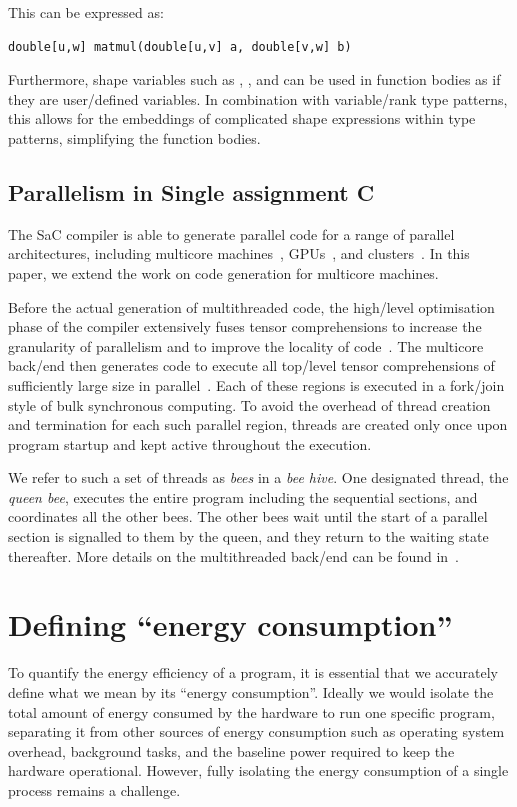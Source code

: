 This can be expressed as:
\begin{verbatim}
double[u,w] matmul(double[u,v] a, double[v,w] b)
\end{verbatim}

Furthermore, shape variables such as , , and  can be used in function bodies as if they are user\-/defined variables.
In combination with variable\-/rank type patterns, this allows for the embeddings of complicated shape expressions within type patterns, simplifying the function bodies.

\subsection{Parallelism in Single assignment C}\label{sec:parallelism}
The SaC compiler is able to generate parallel code for a range of parallel architectures, including multicore machines~\cite{grelck2005shared}, GPUs~\cite{guo2011breaking,janssen2022mapping}, and clusters~\cite{macht2019sac}.
In this paper, we extend the work on code generation for multicore machines.

Before the actual generation of multithreaded code, the high\-/level optimisation phase of the compiler extensively fuses tensor comprehensions to increase the granularity of parallelism and to improve the locality of code~\cite{grelck2006sac}.
The multicore back\-/end then generates code to execute all top\-/level tensor comprehensions of sufficiently large size in parallel~\cite{grelck2005shared}.
Each of these regions is executed in a fork\-/join style of bulk synchronous computing.
To avoid the overhead of thread creation and termination for each such parallel region, threads are created only once upon program startup and kept active throughout the execution.

We refer to such a set of threads as \emph{bees} in a \emph{bee hive}.
One designated thread, the \emph{queen bee}, executes the entire program including the sequential sections, and coordinates all the other bees.
The other bees wait until the start of a parallel section is signalled to them by the queen, and they return to the waiting state thereafter.
More details on the multithreaded back\-/end can be found in~\cite{grelck2005shared}.

\section{Defining ``energy consumption''}\label{sec:energy}
To quantify the energy efficiency of a program, it is essential that we accurately define what we mean by its ``energy consumption''.
Ideally we would isolate the total amount of energy consumed by the hardware to run one specific program, separating it from other sources of energy consumption such as operating system overhead, background tasks, and the baseline power required to keep the hardware operational.
However, fully isolating the energy consumption of a single process remains a challenge.

